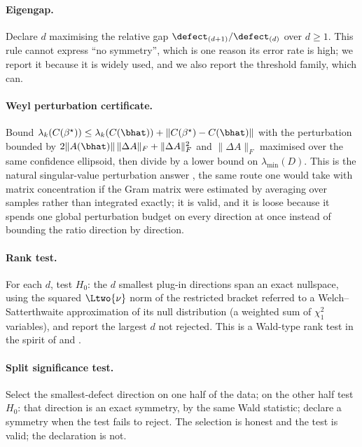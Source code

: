 \paragraph{Eigengap.} Declare $d$ maximising the relative gap
$\defect_{(d+1)}/\defect_{(d)}$ over $d \ge 1$. This rule cannot express ``no
symmetry'', which is one reason its error rate is high; we report it because it
is widely used, and we also report the threshold family, which can.

\paragraph{Weyl perturbation certificate.} Bound
$\lambda_k(C(\beta^\star)) \le \lambda_k(C(\bhat)) + \|C(\beta^\star)-C(\bhat)\|$
with the perturbation bounded by
$2\|A(\bhat)\|\,\|\Delta A\|_F + \|\Delta A\|_F^2$ and $\|\Delta A\|_F$
maximised over the same confidence ellipsoid, then divide by a lower bound on
$\lambda_{\min}(D)$. This is the natural singular-value perturbation answer
\citep{bhatia1997matrix,davis1970rotation,yu2015useful}, the same route one would
take with matrix concentration \citep{tropp2012user} if the Gram matrix were
estimated by averaging over samples rather than integrated exactly; it is valid,
and it is
loose because it spends one global perturbation budget on every direction at
once instead of bounding the ratio direction by direction.

\paragraph{Rank test.} For each $d$, test $H_0$: the $d$ smallest plug-in
directions span an exact nullspace, using the squared $\Ltwo{\nu}$ norm of the
restricted bracket referred to a Welch--Satterthwaite approximation of its null
distribution (a weighted sum of $\chi^2_1$ variables), and report the largest
$d$ not rejected. This is a Wald-type rank test in the spirit of
\citet{robin2000tests} and \citet{kleibergen2006generalized}.

\paragraph{Split significance test.} Select the smallest-defect direction on one
half of the data; on the other half test $H_0$: that direction is an exact
symmetry, by the same Wald statistic; declare a symmetry when the test fails to
reject. The selection is honest and the test is valid; the declaration is not.

